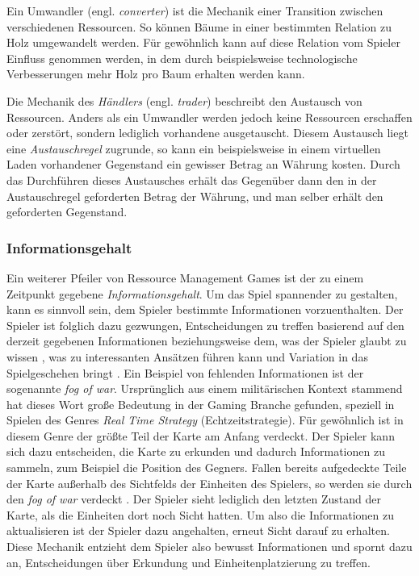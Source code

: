 Ein Umwandler (engl. \textit{converter}) ist die Mechanik einer Transition zwischen verschiedenen Ressourcen. So können Bäume in einer bestimmten Relation zu Holz umgewandelt werden. Für gewöhnlich kann auf diese Relation vom Spieler Einfluss genommen werden, in dem durch beispielsweise technologische Verbesserungen mehr Holz pro Baum erhalten werden kann.

Die Mechanik des \textit{Händlers} (engl. \textit{trader}) beschreibt den Austausch von Ressourcen. Anders als ein Umwandler werden jedoch keine Ressourcen erschaffen oder zerstört, sondern lediglich vorhandene ausgetauscht. Diesem Austausch liegt eine \textit{Austauschregel} zugrunde, so kann ein beispielsweise in einem virtuellen Laden vorhandener Gegenstand ein gewisser Betrag an Währung kosten. Durch das Durchführen dieses Austausches erhält das Gegenüber dann den in der Austauschregel geforderten Betrag der Währung, und man selber erhält den geforderten Gegenstand.

\subsubsection{Informationsgehalt}
Ein weiterer Pfeiler von Ressource Management Games ist der zu einem Zeitpunkt gegebene \textit{Informationsgehalt}. Um das Spiel spannender zu gestalten, kann es sinnvoll sein, dem Spieler bestimmte Informationen vorzuenthalten. Der Spieler ist folglich dazu gezwungen, Entscheidungen zu treffen basierend auf den derzeit gegebenen Informationen beziehungsweise dem, was der Spieler glaubt zu wissen \cite*[]{paper:information}, was zu interessanten Ansätzen führen kann und Variation in das Spielgeschehen bringt \cite*[]{definition:ressourcemanagementfandom}. Ein Beispiel von fehlenden Informationen ist der sogenannte \textit{fog of war}. Ursprünglich aus einem militärischen Kontext stammend hat dieses Wort große Bedeutung in der Gaming Branche gefunden, speziell in Spielen des Genres \textit{Real Time Strategy} (Echtzeitstrategie). Für gewöhnlich ist in diesem Genre der größte Teil der Karte am Anfang verdeckt. Der Spieler kann sich dazu entscheiden, die Karte zu erkunden und dadurch Informationen zu sammeln, zum Beispiel die Position des Gegners. Fallen bereits aufgedeckte Teile der Karte außerhalb des Sichtfelds der Einheiten des Spielers, so werden sie durch den \textit{fog of war} verdeckt \cite*[]{article:fogofwar}. Der Spieler sieht lediglich den letzten Zustand der Karte, als die Einheiten dort noch Sicht hatten. Um also die Informationen zu aktualisieren ist der Spieler dazu angehalten, erneut Sicht darauf zu erhalten. Diese Mechanik entzieht dem Spieler also bewusst Informationen und spornt dazu an, Entscheidungen über Erkundung und Einheitenplatzierung zu treffen. 


